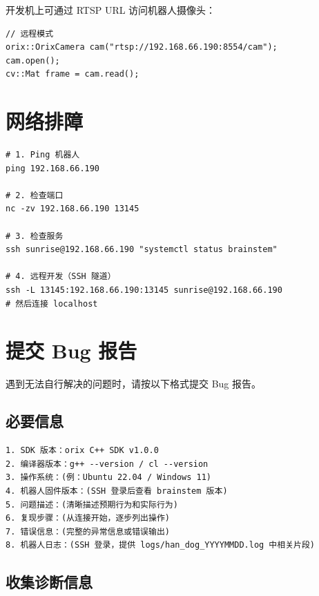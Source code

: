\documentclass[a4paper,11pt,openany]{book}
\begin{document}
开发机上可通过 RTSP URL 访问机器人摄像头：

\begin{lstlisting}[style=cpp]
// 远程模式
orix::OrixCamera cam("rtsp://192.168.66.190:8554/cam");
cam.open();
cv::Mat frame = cam.read();
\end{lstlisting}

\section{网络排障}

\begin{lstlisting}[style=bash]
# 1. Ping 机器人
ping 192.168.66.190

# 2. 检查端口
nc -zv 192.168.66.190 13145

# 3. 检查服务
ssh sunrise@192.168.66.190 "systemctl status brainstem"

# 4. 远程开发（SSH 隧道）
ssh -L 13145:192.168.66.190:13145 sunrise@192.168.66.190
# 然后连接 localhost
\end{lstlisting}

\section{提交 Bug 报告}

遇到无法自行解决的问题时，请按以下格式提交 Bug 报告。

\subsection{必要信息}

\begin{lstlisting}[style=plain]
1. SDK 版本：orix C++ SDK v1.0.0
2. 编译器版本：g++ --version / cl --version
3. 操作系统：(例：Ubuntu 22.04 / Windows 11)
4. 机器人固件版本：(SSH 登录后查看 brainstem 版本)
5. 问题描述：(清晰描述预期行为和实际行为)
6. 复现步骤：(从连接开始，逐步列出操作)
7. 错误信息：(完整的异常信息或错误输出)
8. 机器人日志：(SSH 登录，提供 logs/han_dog_YYYYMMDD.log 中相关片段)
\end{lstlisting}

\subsection{收集诊断信息}
\end{document}
